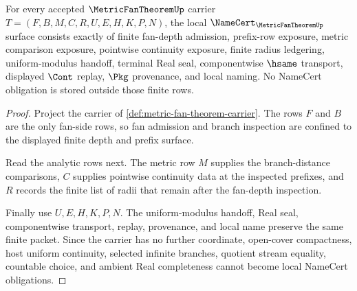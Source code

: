 \begin{theorem}
\label{thm:metric-fan-theorem-namecert-obligations}
For every accepted $\MetricFanTheoremUp$ carrier $T=(F,B,M,C,R,U,E,H,K,P,N)$, the local $\NameCert_{\MetricFanTheoremUp}$ surface consists exactly of finite fan-depth admission, prefix-row exposure, metric comparison exposure, pointwise continuity exposure, finite radius ledgering, uniform-modulus handoff, terminal Real seal, componentwise $\hsame$ transport, displayed $\Cont$ replay, $\Pkg$ provenance, and local naming. No NameCert obligation is stored outside those finite rows.
\end{theorem}
\begin{proof}
Project the carrier of \autoref{def:metric-fan-theorem-carrier}. The rows $F$ and $B$ are the only fan-side rows, so fan admission and branch inspection are confined to the displayed finite depth and prefix surface.

Read the analytic rows next. The metric row $M$ supplies the branch-distance comparisons, $C$ supplies pointwise continuity data at the inspected prefixes, and $R$ records the finite list of radii that remain after the fan-depth inspection.

Finally use $U,E,H,K,P,N$. The uniform-modulus handoff, Real seal, componentwise transport, replay, provenance, and local name preserve the same finite packet. Since the carrier has no further coordinate, open-cover compactness, host uniform continuity, selected infinite branches, quotient stream equality, countable choice, and ambient Real completeness cannot become local NameCert obligations.
\end{proof}

